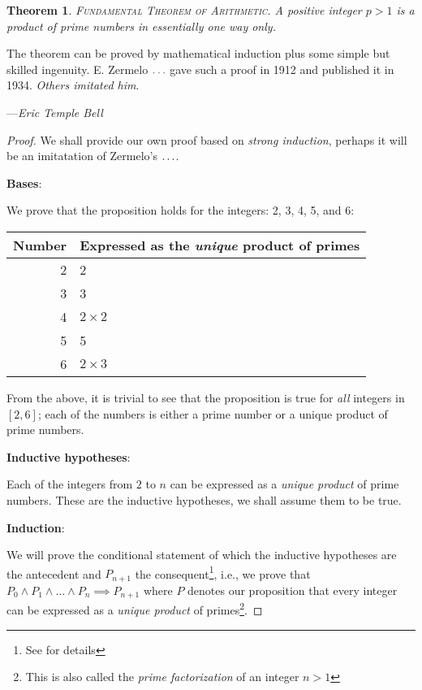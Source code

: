 \documentclass[a4paper]{article}
\newtheorem{theorem}{Theorem}
\begin{document}
\begin{theorem}
    \label{theorem: fta}
    \textsc{Fundamental Theorem of Arithmetic}. A positive integer $p>1$ is a product of prime numbers in essentially one way only.
\end{theorem}
\epigraph
{
    The theorem can be proved by mathematical induction plus some simple but skilled ingenuity. E. Zermelo $\mathellipsis$ gave such a proof in 1912 and published it in 1934. \emph{Others imitated him}.
}
{
    ---\textit{Eric Temple Bell \cite{math-queen-servant}}
}
\begin{proof}
    We shall provide our own proof based on \emph{strong induction}, perhaps it will be an imitatation of Zermelo's $\mathellipsis$.

\noindent\textbf{Bases}:
        
        We prove that the proposition holds for the integers: 2, 3, 4, 5, and 6:
        \begin{center}
            \begin{tabular}{|r|l|}
            \hline
                Number & Expressed as the \emph{unique} product of primes\\
            \hline
            2 & 2\\
            \hline
            3 & 3\\
            \hline
            4 & $2\times 2$\\
            \hline
            5 & 5\\
            \hline
            6 & $2\times 3$\\
            \hline
            \end{tabular}
        \end{center}
        From the above, it is trivial to see that the proposition is true for \emph{all} integers in $[2, 6]$; each of the numbers is either a prime number or a unique product of prime numbers. 

\noindent\textbf{Inductive hypotheses}:

        Each of the integers from $2$ to $n$ can be expressed as a \emph{unique product} of prime numbers.  These are the inductive hypotheses, we shall assume them to be true.
        
\noindent\textbf{Induction}:

        We will prove the conditional statement of which the inductive hypotheses are the antecedent and $P_{n+1}$ the consequent\footnote{See \cite{suber-math-ind} for details}, i.e., we prove that $P_0 \wedge P_1 \wedge \dots \wedge P_n \implies P_{n+1}$ where $P$ denotes our proposition that every integer can be expressed as a \emph{unique product} of primes\footnote{This is also called the \emph{prime factorization} of an integer $n > 1$}.


\end{proof}
\end{document}
